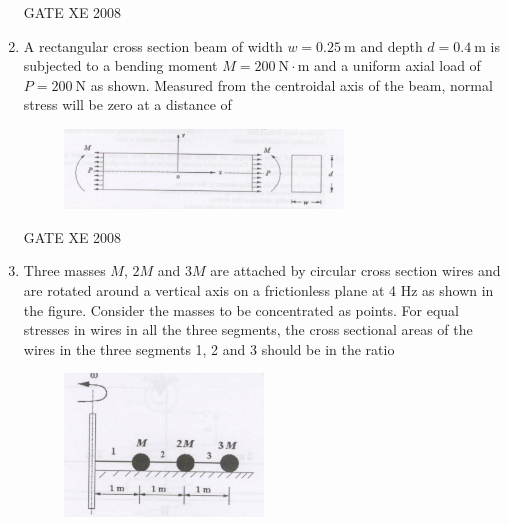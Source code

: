 \documentclass[12pt]{article}
\begin{document}
\begin{enumerate}
GATE XE 2008  

\item A rectangular cross section beam of width $w = 0.25 \ \text{m}$ and depth $d = 0.4 \ \text{m}$ is subjected to a bending moment $M = 200 \ \text{N} \cdot \text{m}$ and a uniform axial load of $P = 200 \ \text{N}$ as shown. Measured from the centroidal axis of the beam, normal stress will be zero at a distance of  

\begin{figure}[H]
\centering
  \includegraphics[width=0.7\textwidth]{figs/ass1_f_q13.png}
  \caption{}
\end{figure}

\begin{enumerate}
\end{enumerate}

GATE XE 2008  


    \item Three masses $M$, $2M$ and $3M$ are attached by circular cross section wires and are rotated around a vertical axis on a frictionless plane at 4 Hz as shown in the figure. Consider the masses to be concentrated as points. For equal stresses in wires in all the three segments, the cross sectional areas of the wires in the three segments 1, 2 and 3 should be in the ratio

    \begin{figure}[H]
\centering
  \includegraphics[width=0.5\textwidth]{figs/ass1_f_q14.png}
  \caption{}
\end{figure}


\end{enumerate}
\end{document}
